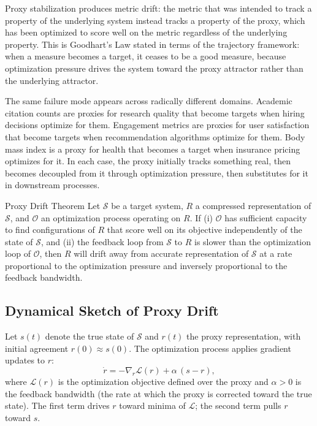 Proxy stabilization produces metric drift: the metric that was intended to track a
property of the underlying system instead tracks a property of the proxy, which has
been optimized to score well on the metric regardless of the underlying property.
This is Goodhart's Law stated in terms of the trajectory framework: when a measure
becomes a target, it ceases to be a good measure, because optimization pressure
drives the system toward the proxy attractor rather than the underlying attractor.

The same failure mode appears across radically different domains. Academic citation
counts are proxies for research quality that become targets when hiring decisions
optimize for them. Engagement metrics are proxies for user satisfaction that become
targets when recommendation algorithms optimize for them. Body mass index is a proxy
for health that becomes a target when insurance pricing optimizes for it. In each
case, the proxy initially tracks something real, then becomes decoupled from it
through optimization pressure, then substitutes for it in downstream processes.

\begin{proposition}{Proxy Drift Theorem}
Let $\mathcal{S}$ be a target system, $R$ a compressed representation of $\mathcal{S}$,
and $\mathcal{O}$ an optimization process operating on $R$. If (i) $\mathcal{O}$
has sufficient capacity to find configurations of $R$ that score well on its
objective independently of the state of $\mathcal{S}$, and (ii) the feedback loop
from $\mathcal{S}$ to $R$ is slower than the optimization loop of $\mathcal{O}$,
then $R$ will drift away from accurate representation of $\mathcal{S}$ at a rate
proportional to the optimization pressure and inversely proportional to the
feedback bandwidth.
\end{proposition}

\subsection*{Dynamical Sketch of Proxy Drift}

Let $s(t)$ denote the true state of $\mathcal{S}$ and $r(t)$ the proxy
representation, with initial agreement $r(0) \approx s(0)$. The optimization
process applies gradient updates to $r$:
\[
  \dot{r} = -\nabla_r \mathcal{L}(r) + \alpha\,(s - r),
\]
where $\mathcal{L}(r)$ is the optimization objective defined over the proxy and
$\alpha > 0$ is the feedback bandwidth (the rate at which the proxy is corrected
toward the true state). The first term drives $r$ toward minima of $\mathcal{L}$;
the second term pulls $r$ toward $s$.


